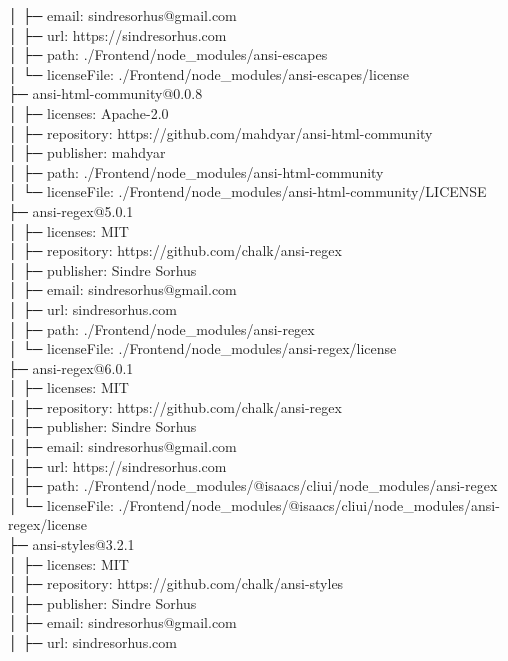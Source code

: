 │  ├─ email: sindresorhus@gmail.com\\
│  ├─ url: https://sindresorhus.com\\
│  ├─ path: ./Frontend/node\_modules/ansi-escapes\\
│  └─ licenseFile: ./Frontend/node\_modules/ansi-escapes/license\\
├─ ansi-html-community@0.0.8\\
│  ├─ licenses: Apache-2.0\\
│  ├─ repository: https://github.com/mahdyar/ansi-html-community\\
│  ├─ publisher: mahdyar\\
│  ├─ path: ./Frontend/node\_modules/ansi-html-community\\
│  └─ licenseFile: ./Frontend/node\_modules/ansi-html-community/LICENSE\\
├─ ansi-regex@5.0.1\\
│  ├─ licenses: MIT\\
│  ├─ repository: https://github.com/chalk/ansi-regex\\
│  ├─ publisher: Sindre Sorhus\\
│  ├─ email: sindresorhus@gmail.com\\
│  ├─ url: sindresorhus.com\\
│  ├─ path: ./Frontend/node\_modules/ansi-regex\\
│  └─ licenseFile: ./Frontend/node\_modules/ansi-regex/license\\
├─ ansi-regex@6.0.1\\
│  ├─ licenses: MIT\\
│  ├─ repository: https://github.com/chalk/ansi-regex\\
│  ├─ publisher: Sindre Sorhus\\
│  ├─ email: sindresorhus@gmail.com\\
│  ├─ url: https://sindresorhus.com\\
│  ├─ path: ./Frontend/node\_modules/@isaacs/cliui/node\_modules/ansi-regex\\
│  └─ licenseFile: ./Frontend/node\_modules/@isaacs/cliui/node\_modules/ansi-regex/license\\
├─ ansi-styles@3.2.1\\
│  ├─ licenses: MIT\\
│  ├─ repository: https://github.com/chalk/ansi-styles\\
│  ├─ publisher: Sindre Sorhus\\
│  ├─ email: sindresorhus@gmail.com\\
│  ├─ url: sindresorhus.com\\
